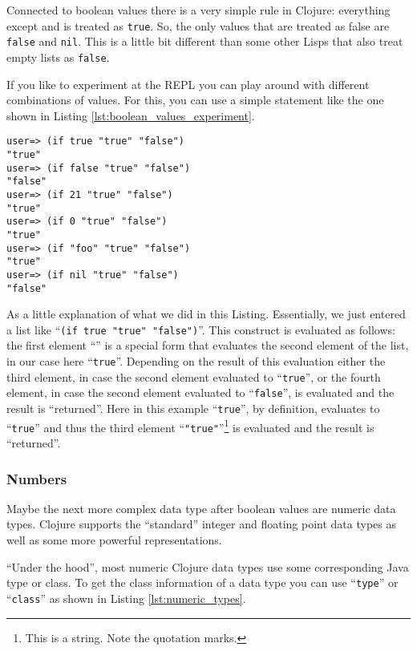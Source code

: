 Connected to boolean values there is a very simple rule in Clojure:
everything except  and  is treated as \texttt{true}.
So, the only values that are treated as false are \texttt{false} and \texttt{nil}.
This is a little bit different than some other Lisps that also treat empty lists as \texttt{false}.

If you like to experiment at the REPL you can play around with different combinations of values.
For this, you can use a simple statement like the one shown in Listing \vref{lst:boolean_values_experiment}.

\begin{lstlisting}[label=lst:boolean_values_experiment, caption=Experiments with Boolean Values at the REPL]
user=> (if true "true" "false")
"true"
user=> (if false "true" "false")
"false"
user=> (if 21 "true" "false")
"true"
user=> (if 0 "true" "false")
"true"
user=> (if "foo" "true" "false")
"true"
user=> (if nil "true" "false")
"false"
\end{lstlisting}

As a little explanation of what we did in this Listing.
Essentially, we just entered a list like ``\texttt{(if true "true" "false")}''.
This construct is evaluated as follows:
the first element ``'' is a special form that evaluates the second element of the list, in our case here ``\texttt{true}''.
Depending on the result of this evaluation either the third element, in case the second element evaluated to ``\texttt{true}'', or the fourth element, in case the second element evaluated to ``\texttt{false}'', is evaluated and the result is ``returned''.
Here in this example ``\texttt{true}'', by definition, evaluates to ``\texttt{true}'' and thus the third element ``\texttt{"true"}''\footnote{This is a string. Note the quotation marks.} is evaluated and the result is ``returned''.

\subsubsection{Numbers}
Maybe the next more complex data type after boolean values are numeric data types.
Clojure supports the ``standard'' integer and floating point data types as well as some more powerful representations.

``Under the hood'', most numeric Clojure data types use some corresponding Java type or class.
To get the class information of a data type you can use ``\texttt{type}'' or ``\texttt{class}'' as shown in Listing \vref{lst:numeric_types}.

